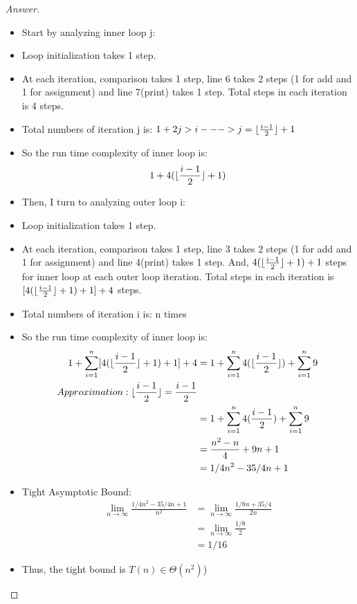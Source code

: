 \documentclass[11pt]{article}
\DeclarePairedDelimiter\floor{\lfloor}{\rfloor}
\theoremstyle{definition}
\theoremstyle{definition}
\theoremstyle{definition}
\begin{document}
\begin{proof}[Answer]
\begin{itemize}
\item Start by analyzing inner loop j:
\item Loop initialization takes 1 step.
\item At each iteration, comparison takes 1 step, line 6 takes 2 steps (1 for add and 1 for assignment) and line 7(print) takes 1 step. Total steps in each iteration is 4 steps.
\item Total numbers of iteration j is: $1+2j > i --->j = \floor{\frac{i-1}{2}} + 1$
\item So the run time complexity of inner loop is:
\begin{align*}
1 + 4(\floor{\frac{i-1}{2}} + 1)
\end{align*}

\item Then, I turn to analyzing outer loop i:
\item Loop initialization takes 1 step.
\item At each iteration, comparison takes 1 step, line 3 takes 2 steps (1 for add  and 1 for assignment) and line 4(print) takes 1 step. And, $4(\floor{\frac{i-1}{2}} + 1)+1$ steps for inner loop at each outer loop iteration. Total steps in each iteration is  $ [4(\floor{\frac{i-1}{2}}+1) + 1] + 4$  steps. 
\item Total numbers of iteration i is: n times
\item So the run time complexity of inner loop is:
\begin{align*}
1 +  \sum_{i=1}^{n}  [4(\floor{\frac{i-1}{2}}+1) + 1] + 4 &= 1 +  \sum_{i=1}^{n}  4(\floor{\frac{i-1}{2}}) + \sum_{i=1}^{n} 9\\
Approximation:\floor{\frac{i-1}{2}} = \frac{i-1}{2}\\
&= 1 + \sum_{i=1}^{n}  4(\frac{i-1}{2}) + \sum_{i=1}^{n} 9\\
&=  \frac{n^2-n}{4} + 9n + 1\\
&= 1/4n^2-35/4n+1
\end{align*}
\item Tight Asymptotic Bound:
\begin{align*}
\lim_{n \to \infty} \frac{1/4n^2-35/4n+1}{n^2} &= \lim_{n \to \infty} \frac{1/8n+35/4}{2n}\\
&= \lim_{n \to \infty} \frac {1/8}{2}\\
&= 1/16
\end{align*}
\item Thus, the tight bound is $T(n) \in \Theta(n^2)$)
\end{itemize}
\end{proof}
\end{document}
